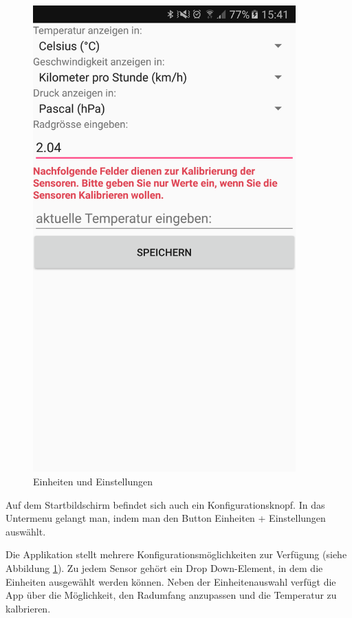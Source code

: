 \begin{figure}[ht]
\begin{minipage}[t]{0.5\textwidth}
    \includegraphics[width=0.9\textwidth]{4Resultate/imag/BLEEinheitenUndEinstellungenStart.png} 
    \caption{Einheiten und Einstellungen}
    \label{einheiten}
 \end{minipage}
\end{figure}

Auf dem Startbildschirm befindet sich auch ein Konfigurationsknopf. In das Untermenu gelangt man, indem man den Button \glqq Einheiten + Einstellungen \grqq auswählt.

Die Applikation stellt mehrere Konfigurationsmöglichkeiten zur Verfügung (siehe Abbildung \ref{einheiten}). Zu jedem Sensor gehört ein Drop Down-Element, in dem die Einheiten ausgewählt werden können. Neben der Einheitenauswahl verfügt die App über die Möglichkeit, den Radumfang anzupassen und die Temperatur zu kalbrieren. 

